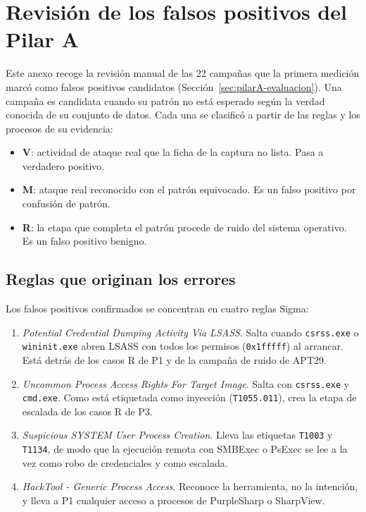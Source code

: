 \chapter{Revisión de los falsos positivos del Pilar A}
\label{anx:revision-fp}

Este anexo recoge la revisión manual de las 22 campañas que la primera medición marcó como
falsos positivos candidatos (Sección~\ref{sec:pilarA-evaluacion}). Una campaña es candidata
cuando su patrón no está esperado según la verdad conocida de su conjunto de datos. Cada una
se clasificó a partir de las reglas y los procesos de su evidencia:
\begin{itemize}
    \item \textbf{V}: actividad de ataque real que la ficha de la captura no lista. Pasa a
    verdadero positivo.
    \item \textbf{M}: ataque real reconocido con el patrón equivocado. Es un falso positivo
    por confusión de patrón.
    \item \textbf{R}: la etapa que completa el patrón procede de ruido del sistema
    operativo. Es un falso positivo benigno.
\end{itemize}

\section*{Reglas que originan los errores}

Los falsos positivos confirmados se concentran en cuatro reglas Sigma:
\begin{enumerate}
    \item \textit{Potential Credential Dumping Activity Via LSASS}. Salta cuando
    \texttt{csrss.exe} o \texttt{wininit.exe} abren LSASS con todos los permisos
    (\texttt{0x1fffff}) al arrancar. Está detrás de los casos R de P1 y de la campaña de
    ruido de APT29.
    \item \textit{Uncommon Process Access Rights For Target Image}. Salta con
    \texttt{csrss.exe} y \texttt{cmd.exe}. Como está etiquetada como inyección
    (\texttt{T1055.011}), crea la etapa de escalada de los casos R de P3.
    \item \textit{Suspicious SYSTEM User Process Creation}. Lleva las etiquetas
    \texttt{T1003} y \texttt{T1134}, de modo que la ejecución remota con SMBExec o PsExec se
    lee a la vez como robo de credenciales y como escalada.
    \item \textit{HackTool - Generic Process Access}. Reconoce la herramienta, no la
    intención, y lleva a P1 cualquier acceso a procesos de PurpleSharp o SharpView.
\end{enumerate}

